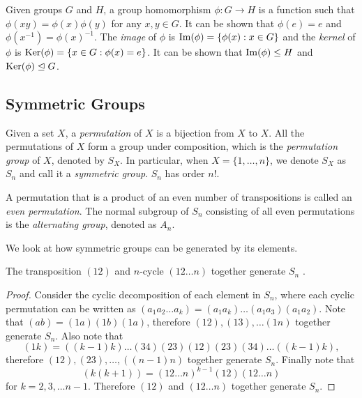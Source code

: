 \begin{definition}
	Given groups $G$ and $H$, a group homomorphism $\phi: G \to H$ is a function such that $\phi(xy) = \phi(x) \phi(y)$ for any $x, y \in G$. It can be shown that $\phi(e) = e$ and $\phi(x^{-1}) = \phi(x) ^ {-1}$. The \textit{image} of $\phi$ is $\operatorname{Im}(\phi) = \{\phi(x) : x\in G\}$ and the \textit{kernel} of $\phi$ is $\operatorname{Ker}(\phi) = \{x \in G : \phi(x) = e\}$. It can be shown that $\operatorname{Im}(\phi) \le H$ and $\operatorname{Ker}(\phi) \trianglelefteq G$.  
\end{definition}

\subsection{Symmetric Groups}
\begin{definition}  \label{def:permutation}
	Given a set $X$, a \textit{permutation} of $X$ is a bijection from $X$ to $X$. All the permutations of $X$ form a group under composition, which is the \textit{permutation group} of $X$, denoted by $S_X$. In particular, when $X = \{1, \dots, n\}$, we denote $S_X$ as $S_n$ and call it a \textit{symmetric group}. $S_n$ has order $n!$. 
\end{definition}

\begin{definition}
	A permutation that is a product of an even number of transpositions is called an \textit{even permutation}. The normal subgroup of $S_n$ consisting of all even permutations is the \textit{alternating group}, denoted as $A_n$. 
\end{definition}

We look at how symmetric groups can be generated by its elements. 

\begin{theorem} \label{thm:symmetric-12-12n}
	The transposition $(12)$ and $n$-cycle $(12 \dots n)$ together generate $S_n$ . 
\end{theorem}
\begin{proof}
	Consider the cyclic decomposition of each element in $S_n$, where each cyclic permutation can be written as 
	$
	(a_1a_2\dots a_k) = (a_1 a_k) \dots (a_1 a_3) (a_1 a_2). 
	$
	Note that $(ab) = (1a)(1b)(1a)$, therefore $(12), (13), \ldots (1n)$ together generate $S_n$. Also note that  
	$$(1k)=((k-1)k)\dots(34)(23)(12)(23)(34)\dots((k-1)k),$$
	therefore $(12), (23), \dots, ((n-1)n)$ together generate $S_n$. Finally note that 
	$$
	(k(k+1)) = (12\dots n)^{k-1} (12) (12\dots n)
	$$
	for $k = 2, 3, \dots n - 1$. Therefore $(12)$ and $(12 \dots n)$ together generate $S_n$. 
\end{proof}

